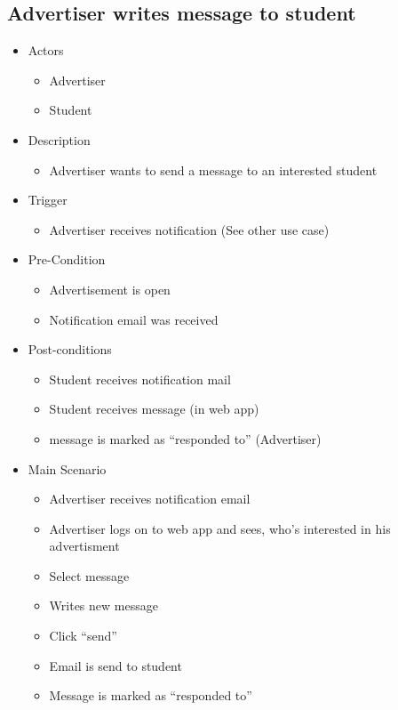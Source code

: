 \documentclass[a4paper,11pt]{article}
\begin{document}
\begin{itemize}
\subsection*{Advertiser writes message to student}
\begin{itemize}
  \item Actors
    \begin{itemize}
      \item Advertiser
      \item Student
    \end{itemize}
  \item Description
    \begin{itemize}
      \item Advertiser wants to send a message to an interested student
    \end{itemize}
  \item Trigger
    \begin{itemize}
      \item Advertiser receives notification (See other use case)
    \end{itemize}
  \item Pre-Condition
    \begin{itemize}
      \item Advertisement is open
      \item Notification email was received
    \end{itemize}
  \item Post-conditions
    \begin{itemize}
      \item Student receives notification mail
      \item Student receives message (in web app)
      \item message is marked as “responded to” (Advertiser)
    \end{itemize}
  \item Main Scenario
    \begin{itemize}
      \item Advertiser receives notification email
      \item Advertiser logs on to web app and sees, who's interested in his advertisment
      \item Select message
      \item Writes new message
      \item Click “send”
      \item Email is send to student 
      \item Message is marked as “responded to”
    \end{itemize}
\end{itemize}


\end{itemize}
\end{document}
